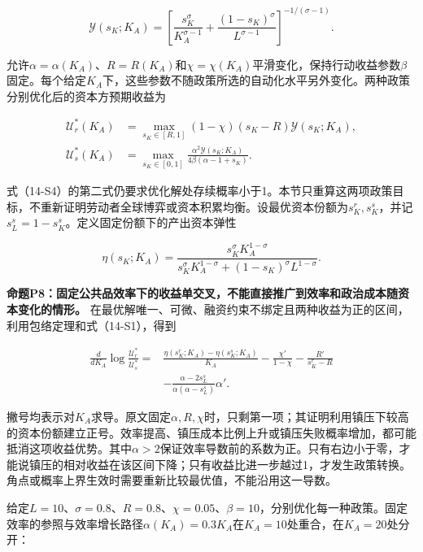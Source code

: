 \documentclass[UTF8,fontset=windows,12pt,a4paper,oneside,openany]{ctexbook}
\begin{document}
\[
\mathcal Y(s_K;K_A)=
\left[\frac{s_K^\sigma}{K_A^{\sigma-1}}
      +\frac{(1-s_K)^\sigma}{L^{\sigma-1}}\right]^{-1/(\sigma-1)}.
\tag{14-S3}
\]

允许$\alpha=\alpha(K_A)$、$R=R(K_A)$和$\chi=\chi(K_A)$平滑变化，保持行动收益参数$\beta$固定。每个给定$K_A$下，这些参数不随政策所选的自动化水平另外变化。两种政策分别优化后的资本方预期收益为

\[
\begin{aligned}
\mathcal U_r^*(K_A)
 &=\max_{s_K\in[R,1]}(1-\chi)(s_K-R)\mathcal Y(s_K;K_A),\\
\mathcal U_s^*(K_A)
 &=\max_{s_K\in[0,1]}
   \frac{\alpha^2\mathcal Y(s_K;K_A)}{4\beta(\alpha-1+s_K)}.
\end{aligned}
\tag{14-S4}
\]

式（14-S4）的第二式仍要求优化解处存续概率小于1。本节只重算这两项政策目标，不重新证明劳动者全球博弈或资本积累均衡。设最优资本份额为$s_K^r,s_K^s$，并记$s_L^s=1-s_K^s$。定义固定份额下的产出资本弹性

\[
\eta(s_K;K_A)=
\frac{s_K^\sigma K_A^{1-\sigma}}
     {s_K^\sigma K_A^{1-\sigma}+(1-s_K)^\sigma L^{1-\sigma}}.
\tag{14-S5}
\]

\textbf{命题P8：固定公共品效率下的收益单交叉，不能直接推广到效率和政治成本随资本变化的情形。} 在最优解唯一、可微、融资约束不绑定且两种收益为正的区间，利用包络定理和式（14-S1），得到

\[
\begin{aligned}
\frac{d}{dK_A}\log\frac{\mathcal U_r^*}{\mathcal U_s^*}
={}&\frac{\eta(s_K^r;K_A)-\eta(s_K^s;K_A)}{K_A}
 -\frac{\chi'}{1-\chi}-\frac{R'}{s_K^r-R}\\
 &-\frac{\alpha-2s_L^s}{\alpha(\alpha-s_L^s)}\alpha'.
\end{aligned}
\tag{14-S6}
\]

撇号均表示对$K_A$求导。原文固定$\alpha,R,\chi$时，只剩第一项；其证明利用镇压下较高的资本份额建立正号。效率提高、镇压成本比例上升或镇压失败概率增加，都可能抵消这项收益优势。其中$\alpha>2$保证效率导数前的系数为正。只有右边小于零，才能说镇压的相对收益在该区间下降；只有收益比进一步越过1，才发生政策转换。角点或概率上界生效时需要重新比较最优值，不能沿用这一导数。

给定$L=10$、$\sigma=0.8$、$R=0.8$、$\chi=0.05$、$\beta=10$，分别优化每一种政策。固定效率的参照与效率增长路径$\alpha(K_A)=0.3K_A$在$K_A=10$处重合，在$K_A=20$处分开：
\end{document}
